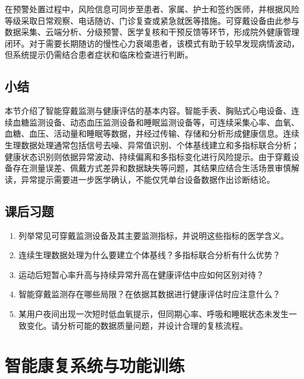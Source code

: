 在预警处置过程中，风险信息可同步至患者、家属、护士和签约医师，并根据风险等级采取日常观察、电话随访、门诊复查或紧急就医等措施。可穿戴设备由此参与数据采集、云端分析、分级预警、医学复核和干预反馈等环节，形成院外健康管理闭环。对于需要长期随访的慢性心力衰竭患者，该模式有助于较早发现病情波动，但系统提示仍需结合患者症状和临床检查进行判断。





\subsection*{小结}

本节介绍了智能穿戴监测与健康评估的基本内容。智能手表、胸贴式心电设备、连续血糖监测设备、动态血压监测设备和睡眠监测设备等，可连续采集心率、血氧、血糖、血压、活动量和睡眠等数据，并经过传输、存储和分析形成健康信息。连续生理数据处理通常包括信号去噪、异常值识别、个体基线建立和多指标联合分析；健康状态识别则依据异常波动、持续偏离和多指标变化进行风险提示。由于穿戴设备存在测量误差、佩戴方式差异和数据缺失等问题，其结果应结合生活场景审慎解读，异常提示需要进一步医学确认，不能仅凭单台设备数据作出诊断结论。

\bigskip
\subsection*{课后习题}
\begin{enumerate}
\setlength{\itemsep}{6pt}

\item 列举常见可穿戴监测设备及其主要监测指标，并说明这些指标的医学含义。
\item 连续生理数据处理为什么要建立个体基线？多指标联合分析有什么优势？
\item 运动后短暂心率升高与持续异常升高在健康评估中应如何区别对待？
\item 智能穿戴监测存在哪些局限？在依据其数据进行健康评估时应注意什么？
\item 某用户夜间出现一次短时低血氧提示，但同期心率、呼吸和睡眠状态未发生一致变化。请分析可能的数据质量问题，并设计合理的复核流程。
\end{enumerate}

\clearpage
\section{智能康复系统与功能训练}

